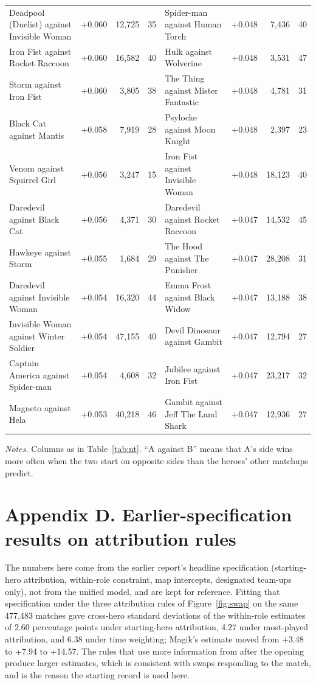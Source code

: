 \documentclass[11pt]{article}
\begin{document}
\begin{landscape}
\begin{center}
{\begin{tabular}{l r r r @{\hspace{2em}} l r r r}
Deadpool (Duelist) against Invisible Woman & +0.060 & 12,725 & 35 & Spider-man against Human Torch & +0.048 & 7,436 & 40 \\
Iron Fist against Rocket Raccoon & +0.060 & 16,582 & 40 & Hulk against Wolverine & +0.048 & 3,531 & 47 \\
Storm against Iron Fist & +0.060 & 3,805 & 38 & The Thing against Mister Fantastic & +0.048 & 4,781 & 31 \\
Black Cat against Mantis & +0.058 & 7,919 & 28 & Psylocke against Moon Knight & +0.048 & 2,397 & 23 \\
Venom against Squirrel Girl & +0.056 & 3,247 & 15 & Iron Fist against Invisible Woman & +0.048 & 18,123 & 40 \\
Daredevil against Black Cat & +0.056 & 4,371 & 30 & Daredevil against Rocket Raccoon & +0.047 & 14,532 & 45 \\
Hawkeye against Storm & +0.055 & 1,684 & 29 & The Hood against The Punisher & +0.047 & 28,208 & 31 \\
Daredevil against Invisible Woman & +0.054 & 16,320 & 44 & Emma Frost against Black Widow & +0.047 & 13,188 & 38 \\
Invisible Woman against Winter Soldier & +0.054 & 47,155 & 40 & Devil Dinosaur against Gambit & +0.047 & 12,794 & 27 \\
Captain America against Spider-man & +0.054 & 4,608 & 32 & Jubilee against Iron Fist & +0.047 & 23,217 & 32 \\
Magneto against Hela & +0.053 & 40,218 & 46 & Gambit against Jeff The Land Shark & +0.047 & 12,936 & 27 \\
\bottomrule
\end{tabular}
}
\end{center}
\vspace{-2pt}
\noindent\begin{minipage}{\linewidth}\footnotesize
\emph{Notes.} Columns as in Table~\ref{tab:nt}. ``A against B'' means that A's side wins more often when
the two start on opposite sides than the heroes' other matchups predict.
\end{minipage}
\end{landscape}

\section*{Appendix D. Earlier-specification results on attribution rules}

The numbers here come from the earlier report's headline specification (starting-hero attribution,
within-role constraint, map intercepts, designated team-ups only), not from the unified model, and are
kept for reference. Fitting that specification under the three attribution rules of Figure~\ref{fig:swap}
on the same 477,483 matches gave cross-hero standard deviations of the within-role estimates of
2.60 percentage points under starting-hero attribution, 4.27 under most-played attribution,
and 6.38 under time weighting; Magik's estimate moved from +3.48 to +7.94 to
+14.57. The rules that use more information from after the opening produce larger estimates, which
is consistent with swaps responding to the match, and is the reason the starting record is used here.
\end{document}
